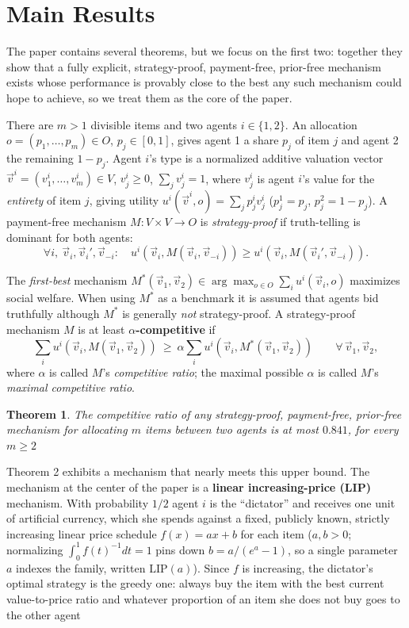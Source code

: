 \documentclass{article}
\newtheorem{theorem}{Theorem}
\begin{document}
\section{Main Results}

The paper contains several theorems, but we focus on the first two: together
they show that a fully explicit, strategy-proof, payment-free, prior-free
mechanism exists whose performance is provably close to the best any such
mechanism could hope to achieve, so we treat them as the core of the paper.

There are $m>1$ divisible items and two agents $i \in \{1,2\}$. An allocation $o=(p_1,\dots,p_m)\in O$, $p_j\in[0,1]$, gives agent 1 a share $p_j$ of item $j$ and agent 2 the remaining $1-p_j$. Agent $i$'s type is a normalized additive valuation vector $\vec v^i=(v^i_1,\dots,v^i_m) \in V$, $v^i_j\ge 0$, $\sum_j v^i_j=1$, where $v^i_j$ is agent $i$'s value for the \textit{entirety} of item $j$, giving utility $u^i(\vec v^i,o)=\sum_j p^i_j v^i_j$ ($p^1_j=p_j$, $p^2_j=1-p_j$). A payment-free mechanism $M:V\times V\to O$ is \emph{strategy-proof} if truth-telling is dominant for both agents:
$$\forall i,\ \vec v_i,\vec v_i',\vec v_{-i}:\quad u^i(\vec v_i, M(\vec v_i,\vec v_{-i})) \ge u^i(\vec v_i, M(\vec v_i',\vec v_{-i})).$$

The \emph{first-best} mechanism $M^*(\vec v_1,\vec v_2)\in \arg\max_{o\in O}\sum_i u^i(\vec v_i,o)$ maximizes social welfare. When using $M^*$ as a benchmark it is assumed that agents bid truthfully although $M^*$ is generally \emph{not} strategy-proof. A strategy-proof mechanism $M$ is at least \textbf{$\alpha$-competitive} if
$$\sum_i u^i(\vec v_i, M(\vec v_1,\vec v_2)) \ \ge\ \alpha\sum_i u^i(\vec v_i, M^*(\vec v_1,\vec v_2)) \qquad \forall\, \vec v_1,\vec v_2,$$
where  $\alpha$ is called $M$'s \textit{competitive ratio}; the maximal possible $\alpha$ is called $M$'s \textit{maximal competitive ratio}.

\begin{theorem}
 The competitive ratio of any strategy-proof, payment-free, prior-free mechanism for allocating $m$ items between two agents is at most $0.841$, for every $m\ge 2$
\end{theorem}

Theorem 2 exhibits a mechanism that nearly meets this upper bound. The mechanism at the center of the paper is a \textbf{linear increasing-price (LIP)} mechanism. With probability $1/2$ agent $i$ is the ``dictator'' and receives one unit of artificial currency, which she spends against a fixed, publicly known, strictly increasing linear price schedule $f(x)=ax+b$ for each item ($a,b>0$; normalizing $\int_0^1 f(t)^{-1}dt=1$ pins down $b=a/(e^a-1)$, so a single parameter $a$ indexes the family, written $\mathrm{LIP}(a)$). Since $f$ is increasing, the dictator's optimal strategy is the greedy one: always buy the item with the best current value-to-price ratio and whatever proportion of an item she does not buy goes to the other agent
\end{document}
